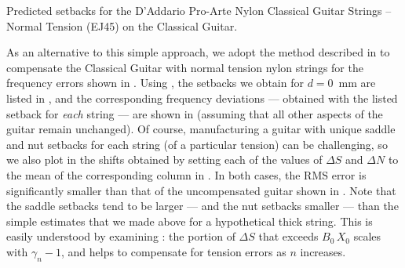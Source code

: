 
\begin{table}%
  \centering
  \caption{\label{tbl:ej45_setbacks} Predicted setbacks for the D'Addario Pro-Arte Nylon Classical Guitar Strings -- Normal Tension (EJ45) on the Classical Guitar.}
  
\end{table}%

As an alternative to this simple approach, we adopt the method described in  to compensate the Classical Guitar with normal tension nylon strings for the frequency errors shown in . Using , the setbacks we obtain for $d = 0$~mm are listed in , and the corresponding frequency deviations --- obtained with the listed setback for \emph{each} string --- are shown in  (assuming that all other aspects of the guitar remain unchanged). Of course, manufacturing a guitar with unique saddle and nut setbacks for each string (of a particular tension) can be challenging, so we also plot in  the shifts obtained by setting each of the values of $\Delta S$ and $\Delta N$ to the mean of the corresponding column in  . In both cases, the RMS error is significantly smaller than that of the uncompensated guitar shown in . Note that the saddle setbacks tend to be larger --- and the nut setbacks smaller --- than the simple estimates that we made above for a hypothetical thick string. This is easily understood by examining : the portion of $\Delta S$ that exceeds $B_0\, X_0$ scales with $\gamma_n - 1$, and helps to compensate for tension errors as $n$ increases.

